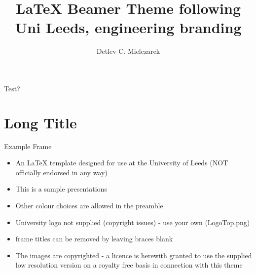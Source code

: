 \documentclass[aspectratio=43,display]{beamer}
\title[Beamer Theme]{LaTeX Beamer Theme following Uni Leeds, engineering branding}
\author[DCM] %
{%
	Detlev C. Mielczarek\inst{1}
}
\institute[UL]{\inst{1}Uni Leeds}
\begin{document}
\maketitle



\begin{frame}{Test?}
	\tableofcontents
\end{frame}

\section[Short Title]{Long Title}

\begin{frame}{Example Frame}
\begin{itemize}[<1->]
	
	\item An LaTeX template designed for use at the University of Leeds (NOT officially endorsed in any way)
	
	\item This is a sample presentations
	
	\item Other colour choices are allowed in the preamble
	
	\item University logo not supplied (copyright issues) - use your own (LogoTop.png)
	
	\item frame titles can be removed by leaving braces blank
	
	\item The images are copyrighted - a licence is herewith granted to use the supplied low resolution version on a royalty free basis in connection with this theme
\end{itemize}
\end{frame}
\end{document}
